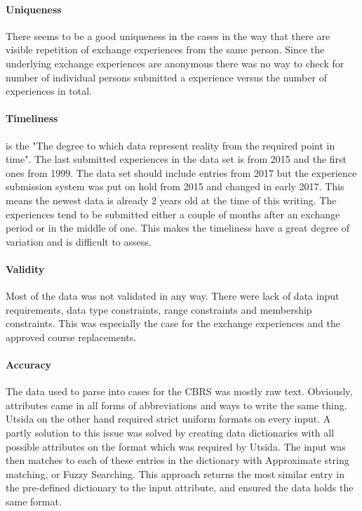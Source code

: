 \paragraph{Uniqueness}
There seems to be a good uniqueness in the cases in the way that there are visible repetition of exchange experiences from the same person. Since the underlying exchange experiences are anonymous there was no way to check for number of individual persons submitted a experience versus the number of experiences in total. 

\paragraph{Timeliness} 
is the "The degree to which data represent reality from the required point in time"\cite{askham2013six}. The last submitted experiences in the data set is from 2015 and the first ones from 1999. The data set should include entries from 2017 but the experience submission system was put on hold from 2015 and changed in early 2017. This means the newest data is already 2 years old at the time of this writing. The experiences tend to be submitted either a couple of months after an exchange period or in the middle of one. This makes the timeliness have a great degree of variation and is difficult to assess. 


\paragraph{Validity} Most of the data was not validated in any way. There were lack of data input requirements, data type constraints, range constraints and membership constraints. This was especially the case for the exchange experiences and the approved course replacements.


\paragraph{Accuracy}
The data used to parse into cases for the CBRS was mostly raw text. Obviously, attributes came in all forms of abbreviations and ways to write the same thing. Utsida on the other hand required strict uniform formats on every input. A partly solution to this issue was solved by creating data dictionaries with all possible attributes on the format which was required by Utsida. The input was then matches to each of these entries in the dictionary with Approximate string matching, or Fuzzy Searching. This approach returns the most similar entry in the pre-defined dictionary to the input attribute, and ensured the data holds the same format. 

